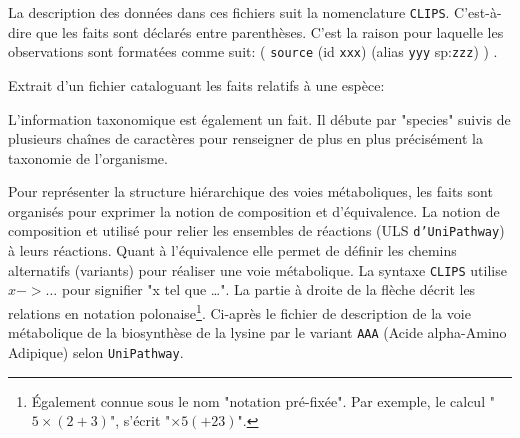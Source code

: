 \begin{refsegment}


La description des données dans ces fichiers suit la nomenclature \texttt{\gls{CLIPS}}. C'est-à-dire que les faits sont déclarés entre parenthèses. C'est la raison pour laquelle les observations sont formatées comme suit: ( \texttt{source} (id \texttt{xxx}) (alias \texttt{yyy} sp:\texttt{zzz})  ) .

Extrait d'un fichier cataloguant les faits relatifs à une espèce:\nolisttopbreak



L'information taxonomique est également un fait. Il débute par "species" suivis de plusieurs chaînes de caractères pour renseigner de plus en plus précisément la taxonomie de l'organisme.


Pour représenter la structure hiérarchique des voies métaboliques, les faits sont organisés pour exprimer la notion de composition et d'équivalence. La notion de composition et utilisé pour relier les ensembles de réactions (\gls{ULS} \texttt{d’UniPathway}) à leurs réactions. Quant à l'équivalence elle permet de définir les chemins alternatifs (variants) pour réaliser une voie métabolique. La syntaxe \texttt{\gls{CLIPS}} utilise $x -> \ldots$ pour signifier "x tel que \ldots". La partie à droite de la flèche décrit les relations en notation polonaise\footnote{Également connue sous le nom "notation pré-fixée". Par exemple, le calcul "$5 \times (2 + 3)$", s'écrit "$\times 5 (+ 2 3)$". }. Ci-après le fichier de description de la voie métabolique de la biosynthèse de la lysine par le variant \texttt{AAA} (Acide alpha-Amino Adipique) selon \texttt{UniPathway}.


\end{refsegment}
